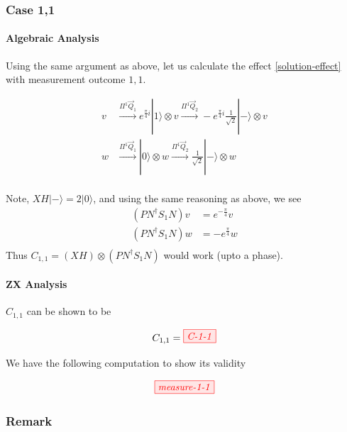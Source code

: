 \subsubsection{Case 1,1}\label{section:case-1-1}

\paragraph{Algebraic Analysis}

Using the same argument as above, let us calculate the effect \eqref{solution-effect} with measurement outcome $1, 1$.

\begin{equation}
	\begin{split}
	v 
	&\xrightarrow{\Pi^1 \vec{Q}_1} e^{\frac{\pi}{4}i} |1\rangle \otimes v 
	\xrightarrow{\Pi^1 \vec{Q}_2} - e^{\frac{\pi}{4}i} \frac{1}{\sqrt{2}}|-\rangle \otimes v  \\
	w 
	&\xrightarrow{\Pi^1 \vec{Q}_1}  |0\rangle \otimes w 
	\xrightarrow{\Pi^1 \vec{Q}_2} \frac{1}{\sqrt{2}}|-\rangle \otimes w  \\
	\end{split}
\end{equation}


Note, $XH|-\rangle = 2 |0 \rangle$, and using the same reasoning as above, we see
\begin{equation}
	\begin{split}
		(P N^{\dagger} S_1 N) v &=  e^{-\frac{\pi}{4}} v \\
		(P N^{\dagger} S_1 N) w &= -e^{\frac{\pi}{4}} w \\	
	\end{split}
\end{equation}
Thus $C_{1,1} = (X H) \otimes (P N^{\dagger} S_1 N)$ would work (upto a phase).

\paragraph{ZX Analysis}

$C_{1, 1}$ can be shown to be 

$$
C_{1, 1} = \tikzfig{C-1-1}
$$

We have the following computation to show its validity 

$$
\tikzfig{measure-1-1}
$$



\subsubsection{Remark}\label{remark:alternating-pauli-clifford}

